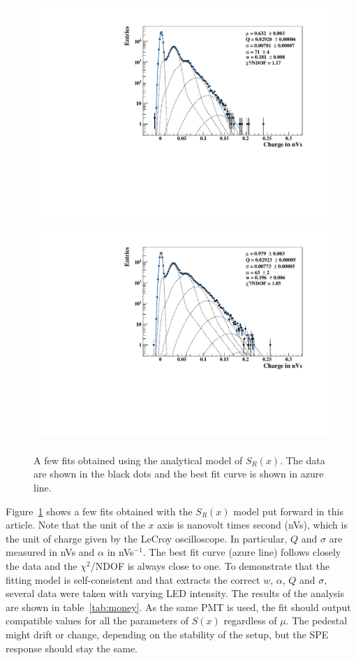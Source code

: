 \documentclass[preprint,12pt]{elsarticle}
\begin{document}
\begin{figure}[!t]
\centering
\includegraphics[width=11.80cm, height=8.25cm]{figures/fit-1-c.pdf} \\[1.5ex]
\includegraphics[width=11.80cm, height=8.25cm]{figures/fit-3-c.pdf} %
\caption{A few fits obtained using the analytical model of $S_R(x)$.  The data are shown in the black dots and the best fit curve is shown in azure line. }
\label{fig:spe}
\end{figure}
Figure~\ref{fig:spe} shows  a few fits obtained with the $S_R(x)$ model put forward in this article. 
Note that the unit of the $x$ axis is nanovolt times second (nVs), which is the unit of charge given by the LeCroy oscilloscope.
In particular, $Q$ and $\sigma$ are measured in nVs and $\alpha$ in nVs$^{-1}$. 
The best fit curve (azure line) follows closely the data and the $\chi^2$/NDOF is always close to one. 
To demonstrate that the fitting model is self-consistent and that extracts the correct $w$, $\alpha$, $Q$ and $\sigma$, several data were taken with varying LED intensity. 
The results of the analysis are shown in table~\ref{tab:money}. 
As the same PMT is used, the fit should output compatible values for all the parameters of $S(x)$ regardless of $\mu$. 
The pedestal might drift or change, depending on the stability of the setup, but the SPE response should stay the same. 
\end{document}
